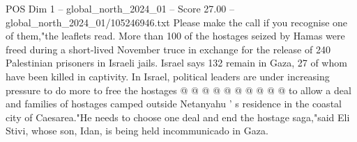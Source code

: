 \begin{textsample}{POS Dim 1 – global\_north\_2024\_01 – Score 27.00 – global\_north\_2024\_01/105246946.txt}
Please make the call if you recognise one of them,"the leaflets read.
More than 100 of the hostages seized by Hamas were freed during a short-lived November truce in exchange for the release of 240 Palestinian prisoners in Israeli jails.
Israel says 132 remain in Gaza, 27 of whom have been killed in captivity.
In Israel, political leaders are under increasing pressure to do more to free the hostages @ @ @ @ @ @ @ @ @ @ to allow a deal and families of hostages camped outside Netanyahu ' s residence in the coastal city of Caesarea."He needs to choose one deal and end the hostage saga,"said Eli Stivi, whose son, Idan, is being held incommunicado in Gaza.

\end{textsample}
